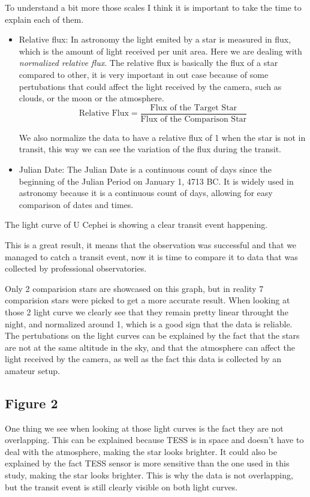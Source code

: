 \documentclass[12pt,a4paper]{article}
\begin{document}
To understand a bit more those scales I think it is important to take the time to explain each of them.
\begin{itemize}
    \item Relative flux: In astronomy the light emited by a star is measured in flux, which is the amount of light received per unit area. Here we are dealing with \textit{normalized relative flux}. 
    The relative flux is basically the flux of a star compared to other, it is very important in out case because of some pertubations that could affect the light received by the camera, such as clouds, or the moon or the atmosphere.
    \begin{equation}
        \text{Relative Flux} = \frac{\text{Flux of the Target Star}}{\text{Flux of the Comparison Star}}
    \end{equation}

    We also normalize the data to have a relative flux of 1 when the star is not in transit, this way we can see the variation of the flux during the transit.
    \item Julian Date: The Julian Date is a continuous count of days since the beginning of the Julian Period on January 1, 4713 BC. 
    It is widely used in astronomy because it is a continuous count of days, allowing for easy comparison of dates and times.
\end{itemize}


The light curve of U Cephei is showing a clear transit event happening.

This is a great result, it means that the observation was successful and that we managed to catch a transit event, now it is time to compare it to data that was collected by professional observatories.
\medskip

Only 2 comparision stars are showcased on this graph, but in reality 7 comparision stars were picked to get a more accurate result. When looking at those 2 light curve we clearly see that they remain pretty linear throught the night,
and normalized around 1, which is a good sign that the data is reliable. The pertubations on the light curves can be explained by the fact that the stars are not at the same altitude in the sky, and that the atmosphere can affect the light received by the camera, as well as the fact
this data is collected by an amateur setup.

\subsection{Figure 2}
One thing we see when looking at those light curves is the fact they are not overlapping. This can be explained because TESS is in space and doesn't have to deal with the atmosphere, making the star looks brighter. It could also be explained by the fact
TESS sensor is more sensitive than the one used in this study, making the star looks brighter. This is why the data is not overlapping, but the transit event is still clearly visible on both light curves.
\end{document}
